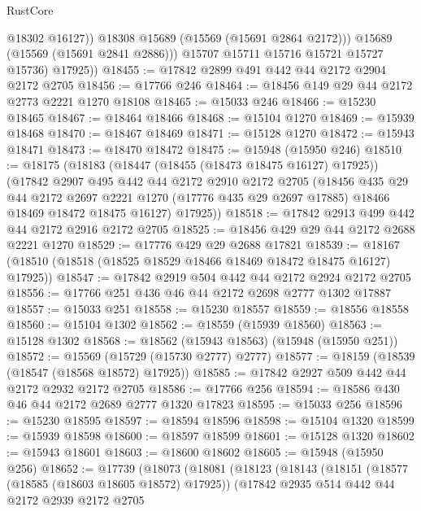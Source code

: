 \begin{lexlean}{RustCore}
\begin{coremodule}
                  @18302
                  @16127))
              @18308
              @15689
              (@15569 (@15691 @2864 @2172)))
            @15689
            (@15569 (@15691 @2841 @2886)))
          @15707
          @15711
          @15716
          @15721
          @15727
          @15736)
        @17925))
@18455 := @17842 @2899 @491 @442 @44 @2172 @2904 @2172 @2705
@18456 := @17766 @246
@18464 := @18456 @149 @29 @44 @2172 @2773 @2221 @1270 @18108
@18465 := @15033 @246
@18466 := @15230 @18465
@18467 := @18464 @18466
@18468 := @15104 @1270
@18469 := @15939 @18468
@18470 := @18467 @18469
@18471 := @15128 @1270
@18472 := @15943 @18471
@18473 := @18470 @18472
@18475 := @15948 (@15950 @246)
@18510 := @18175
    (@18183
      (@18447 (@18455 (@18473 @18475 @16127) @17925))
      (@17842
        @2907
        @495
        @442
        @44
        @2172
        @2910
        @2172
        @2705
        (@18456
          @435
          @29
          @44
          @2172
          @2697
          @2221
          @1270
          (@17776 @435 @29 @2697 @17885)
          @18466
          @18469
          @18472
          @18475
          @16127)
        @17925))
@18518 := @17842 @2913 @499 @442 @44 @2172 @2916 @2172 @2705
@18525 := @18456 @429 @29 @44 @2172 @2688 @2221 @1270
@18529 := @17776 @429 @29 @2688 @17821
@18539 := @18167 (@18510 (@18518 (@18525 @18529 @18466 @18469 @18472 @18475 @16127) @17925))
@18547 := @17842 @2919 @504 @442 @44 @2172 @2924 @2172 @2705
@18556 := @17766 @251 @436 @46 @44 @2172 @2698 @2777 @1302 @17887
@18557 := @15033 @251
@18558 := @15230 @18557
@18559 := @18556 @18558
@18560 := @15104 @1302
@18562 := @18559 (@15939 @18560)
@18563 := @15128 @1302
@18568 := @18562 (@15943 @18563) (@15948 (@15950 @251))
@18572 := @15569 (@15729 (@15730 @2777) @2777)
@18577 := @18159 (@18539 (@18547 (@18568 @18572) @17925))
@18585 := @17842 @2927 @509 @442 @44 @2172 @2932 @2172 @2705
@18586 := @17766 @256
@18594 := @18586 @430 @46 @44 @2172 @2689 @2777 @1320 @17823
@18595 := @15033 @256
@18596 := @15230 @18595
@18597 := @18594 @18596
@18598 := @15104 @1320
@18599 := @15939 @18598
@18600 := @18597 @18599
@18601 := @15128 @1320
@18602 := @15943 @18601
@18603 := @18600 @18602
@18605 := @15948 (@15950 @256)
@18652 := @17739
    (@18073
      (@18081
        (@18123
          (@18143
            (@18151
              (@18577 (@18585 (@18603 @18605 @18572) @17925))
              (@17842
                @2935
                @514
                @442
                @44
                @2172
                @2939
                @2172
                @2705

\end{coremodule}
\end{lexlean}
